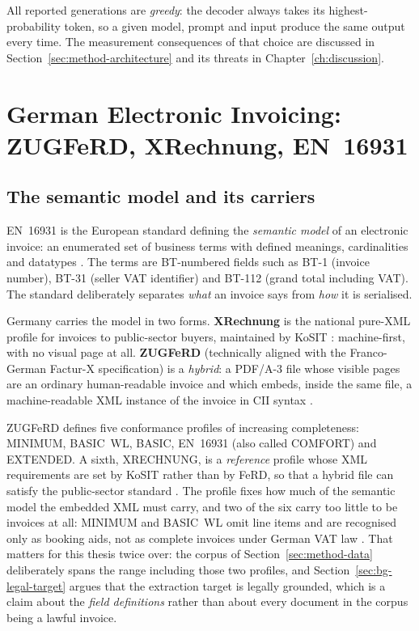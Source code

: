 All reported generations are \emph{greedy}: the decoder always takes its
highest-probability token, so a given model, prompt and input produce the same output
every time. The measurement consequences of that choice are discussed in
Section~\ref{sec:method-architecture} and its threats in Chapter~\ref{ch:discussion}.

\section{German Electronic Invoicing: ZUGFeRD, XRechnung, EN~16931}
\label{sec:bg-einvoicing}

\subsection{The semantic model and its carriers}

\ac{EN}~16931 is the European standard defining the \emph{semantic model} of an
electronic invoice: an enumerated set of business terms with defined meanings,
cardinalities and datatypes \parencite{en16931}. The terms are \ac{BT}-numbered fields
such as BT-1 (invoice number), BT-31 (seller \ac{VAT} identifier) and BT-112 (grand
total including \ac{VAT}). The standard deliberately separates \emph{what} an invoice
says from \emph{how} it is serialised.

Germany carries the model in two forms. \textbf{XRechnung} is the national
pure-\ac{XML} profile for invoices to public-sector buyers, maintained by KoSIT
\parencite{xrechnung}: machine-first, with no visual page at all. \textbf{\ac{ZUGFeRD}}
(technically aligned with the Franco-German Factur-X specification) is a \emph{hybrid}:
a \ac{PDF}/A-3 file whose visible pages are an ordinary human-readable invoice and which
embeds, inside the same file, a machine-readable \ac{XML} instance of the invoice in
\ac{CII} syntax \parencite{zugferdanhang}.

\ac{ZUGFeRD} defines five conformance profiles of increasing completeness: MINIMUM,
BASIC~WL, BASIC, EN~16931 (also called COMFORT) and EXTENDED. A sixth, XRECHNUNG, is a
\emph{reference} profile whose \ac{XML} requirements are set by KoSIT rather than by
FeRD, so that a hybrid file can satisfy the public-sector standard
\parencite{ferdprofiles}. The profile fixes how much of the semantic
model the embedded \ac{XML} must carry, and two of the six carry too little to be invoices
at all: MINIMUM and BASIC~WL omit line items and are recognised only as booking aids, not
as complete invoices under German \ac{VAT} law \parencite{ferdprofiles}. That matters for
this thesis twice over: the corpus of Section~\ref{sec:method-data} deliberately spans the
range including those two profiles, and Section~\ref{sec:bg-legal-target} argues that the
extraction target is legally grounded, which is a claim about the \emph{field definitions}
rather than about every document in the corpus being a lawful invoice.

